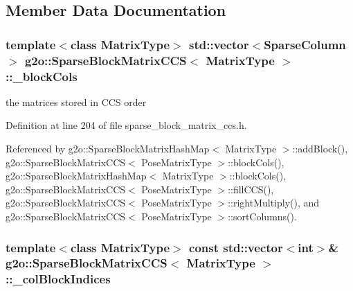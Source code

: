 \subsection{Member Data Documentation}
\subsubsection[{\texorpdfstring{\+\_\+block\+Cols}{_blockCols}}]{\setlength{\rightskip}{0pt plus 5cm}template$<$class Matrix\+Type$>$ std\+::vector$<${\bf Sparse\+Column}$>$ {\bf g2o\+::\+Sparse\+Block\+Matrix\+C\+CS}$<$ Matrix\+Type $>$\+::\+\_\+block\+Cols\hspace{0.3cm}{\ttfamily [protected]}}\hypertarget{classg2o_1_1SparseBlockMatrixCCS_ab6b173607380a367cc1cd67442c1c3e2}{}\label{classg2o_1_1SparseBlockMatrixCCS_ab6b173607380a367cc1cd67442c1c3e2}


the matrices stored in C\+CS order 



Definition at line 204 of file sparse\+\_\+block\+\_\+matrix\+\_\+ccs.\+h.



Referenced by g2o\+::\+Sparse\+Block\+Matrix\+Hash\+Map$<$ Matrix\+Type $>$\+::add\+Block(), g2o\+::\+Sparse\+Block\+Matrix\+C\+C\+S$<$ Pose\+Matrix\+Type $>$\+::block\+Cols(), g2o\+::\+Sparse\+Block\+Matrix\+Hash\+Map$<$ Matrix\+Type $>$\+::block\+Cols(), g2o\+::\+Sparse\+Block\+Matrix\+C\+C\+S$<$ Pose\+Matrix\+Type $>$\+::fill\+C\+C\+S(), g2o\+::\+Sparse\+Block\+Matrix\+C\+C\+S$<$ Pose\+Matrix\+Type $>$\+::right\+Multiply(), and g2o\+::\+Sparse\+Block\+Matrix\+C\+C\+S$<$ Pose\+Matrix\+Type $>$\+::sort\+Columns().

\subsubsection[{\texorpdfstring{\+\_\+col\+Block\+Indices}{_colBlockIndices}}]{\setlength{\rightskip}{0pt plus 5cm}template$<$class Matrix\+Type$>$ const std\+::vector$<$int$>$\& {\bf g2o\+::\+Sparse\+Block\+Matrix\+C\+CS}$<$ Matrix\+Type $>$\+::\+\_\+col\+Block\+Indices\hspace{0.3cm}{\ttfamily [protected]}}\hypertarget{classg2o_1_1SparseBlockMatrixCCS_ae31426bfb6b31bd0fd72de2e18dd5a35}{}\label{classg2o_1_1SparseBlockMatrixCCS_ae31426bfb6b31bd0fd72de2e18dd5a35}


